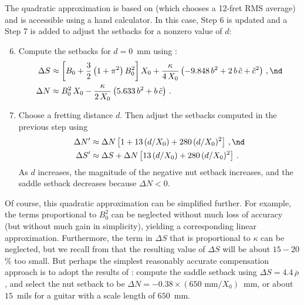 The quadratic approximation is based on  (which chooses a 12-fret RMS average) and  is accessible using a hand calculator. In this case, Step 6 is updated and a Step 7 is added to adjust the setbacks for a nonzero value of $d$:
\begin{enumerate}
    \setcounter{enumi}{5}
    \item Compute the setbacks for $d = 0$~mm using :
    \begin{align*}
        \Delta S &\approx \left[ B_0 + \frac{3}{2} \left(1 + \pi^2\right) B_0^2 \right] X_0 + \frac{\kappa}{4\, X_0} \left( -9.848\, b^2 + 2\, b\, \tilde{c} + \tilde{c}^2 \right)\, , \nd \\
        \Delta N &\approx B_0^2\, X_0 - \frac{\kappa}{2\, X_0} \left( 5.633\, b^2 + b\, \tilde{c} \right)\, .
    \end{align*}
    \item Choose a fretting distance $d$. Then adjust the setbacks computed in the previous step using
    \begin{align*}
        \Delta N^\prime &\approx \Delta N \left[ 1 + 13\, (d/X_0) + 280\, (d/X_0)^2 \right]\, , \nd \\
        \Delta S^\prime &\approx \Delta S + \Delta N \left[13\, (d/X_0) + 280\, (d/X_0)^2 \right]\, .
    \end{align*}
    As $d$ increases, the magnitude of the negative nut setback increases, and the saddle setback decreases because $\Delta N < 0$. 
\end{enumerate}
Of course, this quadratic approximation can be simplified further. For example, the terms proportional to $B_0^2$ can be neglected without much loss of accuracy (but without much gain in simplicity), yielding a corresponding linear approximation. Furthermore, the term in $\Delta S$ that is proportional to $\kappa$ can be neglected, but we recall from  that the resulting value of $\Delta S$ will be about  $15 - 20$\% too small. But perhaps the simplest reasonably accurate compensation approach is to adopt the results of : compute the saddle setback using $\Delta S = 4.4\, \overline{\rho}$, and select the nut setback to be $\Delta N = -0.38 \times (650 \textrm{ mm} / X_0)$~mm, or about $15$~mils for a guitar with a scale length of $650$~mm.


